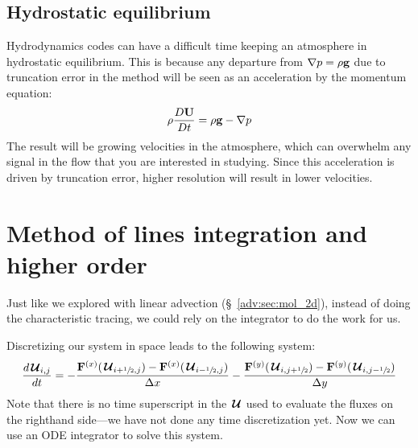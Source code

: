 \subsection{Hydrostatic equilibrium}

Hydrodynamics codes can have a difficult time keeping an atmosphere in
hydrostatic equilibrium.  This is because any departure from $\nabla p
= \rho {\bf g}$ due to truncation error in the method will be seen as an
acceleration by the momentum equation:
\begin{equation}
\rho {\frac{{D{\bf U}}}{D t}} = \rho {\bf g} - \nabla p
\end{equation}
The result will be growing velocities in the atmosphere, which can
overwhelm any signal in the flow that you are interested in studying.
Since this acceleration is driven by truncation error, higher
resolution will result in lower velocities.







\section{Method of lines integration and higher order}

Just like we explored with linear advection (\S~\ref{adv:sec:mol_2d}),
instead of doing the characteristic tracing, we could rely on the
integrator to do the work for us.


Discretizing our system in space leads to the following system:
\begin{equation}
\frac{d{\,\boldsymbol{\mathcal{U}}}_{i,j}}{dt} = -\frac{{\bf F}^{(x)}({\,\boldsymbol{\mathcal{U}}}_{i+{\sfrac{1}{2}},j}) - {\bf F}^{(x)}({\,\boldsymbol{\mathcal{U}}}_{i-{\sfrac{1}{2}},j})}{\Delta x}
                      -\frac{{\bf F}^{(y)}({\,\boldsymbol{\mathcal{U}}}_{i,j+{\sfrac{1}{2}}}) - {\bf F}^{(y)}({\,\boldsymbol{\mathcal{U}}}_{i,j-{\sfrac{1}{2}}})}{\Delta y}
\end{equation}
Note that there is no time superscript in the ${\,\boldsymbol{\mathcal{U}}}$ used to evaluate the
fluxes on the righthand side---we have not done any time
discretization yet.  Now we can use an ODE integrator to solve this system.

